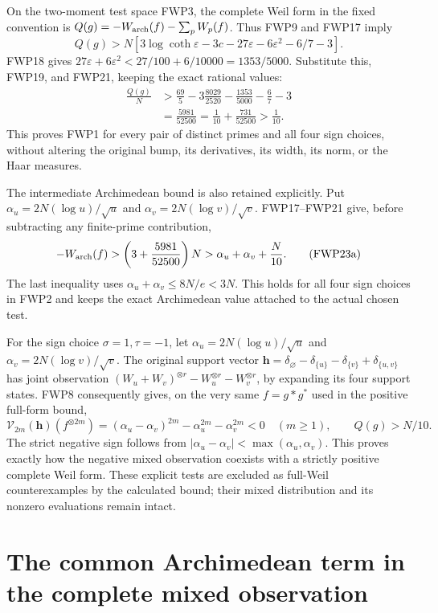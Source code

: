\documentclass[11pt]{article}
\begin{document}
On the two-moment test space FWP3, the complete Weil form in the
fixed convention is
$Q(g)=-W_{\rm arch}(f)-\sum_pW_p(f)$.
Thus FWP9 and FWP17 imply
\[
 Q(g)>N\left[3\log\coth\varepsilon-3c
                  -27\varepsilon-6\varepsilon^2-6/7-3\right].
 \tag{FWP22}
\]
FWP18 gives
$27\varepsilon+6\varepsilon^2<27/100+6/10000=1353/5000$.
Substitute this, FWP19, and FWP21, keeping the exact rational values:
\[
\begin{split}
 \frac{Q(g)}{N}
 &>\frac{69}{5}-3\frac{8029}{2520}
                        -\frac{1353}{5000}-\frac67-3\\
 &=\frac{5981}{52500}
  =\frac1{10}+\frac{731}{52500}>\frac1{10}.
\end{split}
\tag{FWP23}
\]
This proves FWP1 for every pair of distinct primes and all four
sign choices, without altering the original bump, its derivatives,
its width, its norm, or the Haar measures.

The intermediate Archimedean bound is also retained explicitly.
Put $\alpha_u=2N(\log u)/\sqrt u$ and
$\alpha_v=2N(\log v)/\sqrt v$. FWP17--FWP21 give, before
subtracting any finite-prime contribution,
\[
 -W_{\rm arch}(f)>
       \left(3+\frac{5981}{52500}\right)N
       >\alpha_u+\alpha_v+\frac{N}{10}.
 \tag{FWP23a}
\]
The last inequality uses $\alpha_u+\alpha_v\le8N/e<3N$.
This holds for all four sign choices in FWP2 and keeps the exact
Archimedean value attached to the actual chosen test.

For the sign choice $\sigma=1,\tau=-1$, let
$\alpha_u=2N(\log u)/\sqrt u$ and
$\alpha_v=2N(\log v)/\sqrt v$.
The original support vector
$\mathbf h=\delta_\varnothing-\delta_{\{u\}}-
\delta_{\{v\}}+\delta_{\{u,v\}}$
has joint observation
$(W_u+W_v)^{\otimes r}-W_u^{\otimes r}-W_v^{\otimes r}$,
by expanding its four support states. FWP8 consequently gives,
on the very same $f=g*g^*$ used in the positive full-form bound,
\[
 \mathcal V_{2m}(\mathbf h)(f^{\otimes2m})
   =(\alpha_u-\alpha_v)^{2m}-\alpha_u^{2m}-\alpha_v^{2m}<0
 \quad(m\ge1),\qquad Q(g)>N/10.
 \tag{FWP24}
\]
The strict negative sign follows from
$|\alpha_u-\alpha_v|<\max(\alpha_u,\alpha_v)$.
This proves exactly how the negative mixed observation coexists
with a strictly positive complete Weil form. These explicit tests
are excluded as full-Weil counterexamples by the calculated bound;
their mixed distribution and its nonzero evaluations remain intact.


\section{The common Archimedean term in the complete mixed observation}
\label{sec:full-weil-joint}
\end{document}
